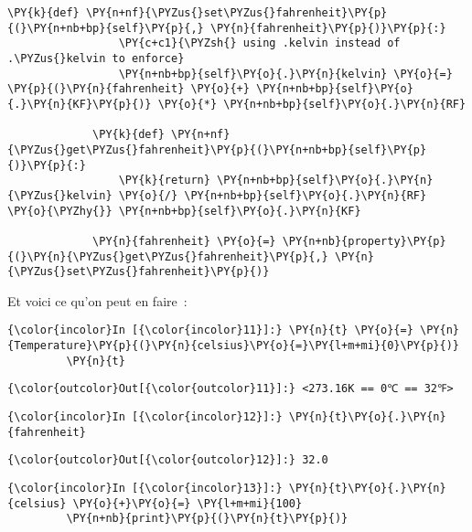 \begin{Verbatim}[commandchars=\\\{\}]
             \PY{k}{def} \PY{n+nf}{\PYZus{}set\PYZus{}fahrenheit}\PY{p}{(}\PY{n+nb+bp}{self}\PY{p}{,} \PY{n}{fahrenheit}\PY{p}{)}\PY{p}{:}
                 \PY{c+c1}{\PYZsh{} using .kelvin instead of .\PYZus{}kelvin to enforce}
                 \PY{n+nb+bp}{self}\PY{o}{.}\PY{n}{kelvin} \PY{o}{=} \PY{p}{(}\PY{n}{fahrenheit} \PY{o}{+} \PY{n+nb+bp}{self}\PY{o}{.}\PY{n}{KF}\PY{p}{)} \PY{o}{*} \PY{n+nb+bp}{self}\PY{o}{.}\PY{n}{RF}
         
             \PY{k}{def} \PY{n+nf}{\PYZus{}get\PYZus{}fahrenheit}\PY{p}{(}\PY{n+nb+bp}{self}\PY{p}{)}\PY{p}{:}
                 \PY{k}{return} \PY{n+nb+bp}{self}\PY{o}{.}\PY{n}{\PYZus{}kelvin} \PY{o}{/} \PY{n+nb+bp}{self}\PY{o}{.}\PY{n}{RF} \PY{o}{\PYZhy{}} \PY{n+nb+bp}{self}\PY{o}{.}\PY{n}{KF}
             
             \PY{n}{fahrenheit} \PY{o}{=} \PY{n+nb}{property}\PY{p}{(}\PY{n}{\PYZus{}get\PYZus{}fahrenheit}\PY{p}{,} \PY{n}{\PYZus{}set\PYZus{}fahrenheit}\PY{p}{)}
\end{Verbatim}


    Et voici ce qu'on peut en faire~:

    \begin{Verbatim}[commandchars=\\\{\}]
{\color{incolor}In [{\color{incolor}11}]:} \PY{n}{t} \PY{o}{=} \PY{n}{Temperature}\PY{p}{(}\PY{n}{celsius}\PY{o}{=}\PY{l+m+mi}{0}\PY{p}{)}
         \PY{n}{t}
\end{Verbatim}


\begin{Verbatim}[commandchars=\\\{\}]
{\color{outcolor}Out[{\color{outcolor}11}]:} <273.16K == 0℃ == 32℉>
\end{Verbatim}
            
    \begin{Verbatim}[commandchars=\\\{\}]
{\color{incolor}In [{\color{incolor}12}]:} \PY{n}{t}\PY{o}{.}\PY{n}{fahrenheit}
\end{Verbatim}


\begin{Verbatim}[commandchars=\\\{\}]
{\color{outcolor}Out[{\color{outcolor}12}]:} 32.0
\end{Verbatim}
            
    \begin{Verbatim}[commandchars=\\\{\}]
{\color{incolor}In [{\color{incolor}13}]:} \PY{n}{t}\PY{o}{.}\PY{n}{celsius} \PY{o}{+}\PY{o}{=} \PY{l+m+mi}{100}
         \PY{n+nb}{print}\PY{p}{(}\PY{n}{t}\PY{p}{)}
\end{Verbatim}


